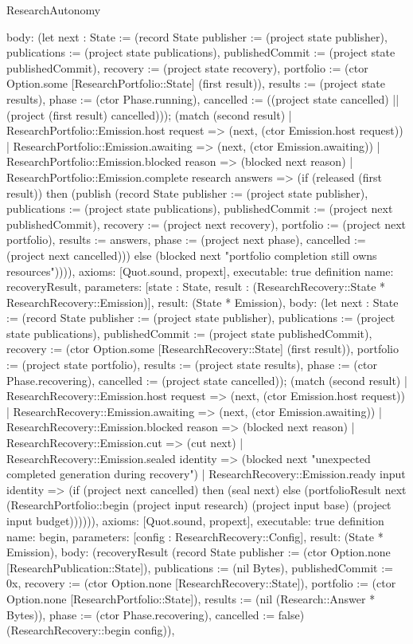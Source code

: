 \begin{lexlean}{ResearchAutonomy}
\begin{semanticmodule}
{ body: (let next : State := (record State {publisher := (project state publisher), publications := (project state publications), publishedCommit := (project state publishedCommit), recovery := (project state recovery), portfolio := (ctor Option.some [ResearchPortfolio::State] (first result)), results := (project state results), phase := (ctor Phase.running), cancelled := ((project state cancelled) || (project (first result) cancelled))}); (match (second result) | ResearchPortfolio::Emission.host request => (next, (ctor Emission.host request)) | ResearchPortfolio::Emission.awaiting => (next, (ctor Emission.awaiting)) | ResearchPortfolio::Emission.blocked reason => (blocked next reason) | ResearchPortfolio::Emission.complete research answers => (if (released (first result)) then (publish (record State {publisher := (project state publisher), publications := (project state publications), publishedCommit := (project next publishedCommit), recovery := (project next recovery), portfolio := (project next portfolio), results := answers, phase := (project next phase), cancelled := (project next cancelled)})) else (blocked next "portfolio completion still owns resources")))),
 axioms: [Quot.sound, propext],
 executable: true
}
definition{
 name: recoveryResult,
 parameters: [state : State, result : (ResearchRecovery::State * ResearchRecovery::Emission)],
 result: (State * Emission),
 body: (let next : State := (record State {publisher := (project state publisher), publications := (project state publications), publishedCommit := (project state publishedCommit), recovery := (ctor Option.some [ResearchRecovery::State] (first result)), portfolio := (project state portfolio), results := (project state results), phase := (ctor Phase.recovering), cancelled := (project state cancelled)}); (match (second result) | ResearchRecovery::Emission.host request => (next, (ctor Emission.host request)) | ResearchRecovery::Emission.awaiting => (next, (ctor Emission.awaiting)) | ResearchRecovery::Emission.blocked reason => (blocked next reason) | ResearchRecovery::Emission.cut => (cut next) | ResearchRecovery::Emission.sealed identity => (blocked next "unexpected completed generation during recovery") | ResearchRecovery::Emission.ready input identity => (if (project next cancelled) then (seal next) else (portfolioResult next (ResearchPortfolio::begin (project input research) (project input base) (project input budget)))))),
 axioms: [Quot.sound, propext],
 executable: true
}
definition{
 name: begin,
 parameters: [config : ResearchRecovery::Config],
 result: (State * Emission),
 body: (recoveryResult (record State {publisher := (ctor Option.none [ResearchPublication::State]), publications := (nil Bytes), publishedCommit := 0x, recovery := (ctor Option.none [ResearchRecovery::State]), portfolio := (ctor Option.none [ResearchPortfolio::State]), results := (nil (Research::Answer * Bytes)), phase := (ctor Phase.recovering), cancelled := false}) (ResearchRecovery::begin config)),
}
\end{semanticmodule}
\end{lexlean}
